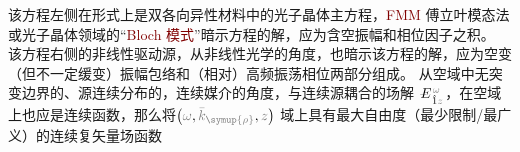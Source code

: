 {\one} 该方程左侧在形式上是双各向异性材料\cite{berryOpticalSingularitiesBianisotropic2005,changWavePropagationBianisotropic2014}中的光子晶体主方程\cite{sakodaOpticalPropertiesPhotonic2005,joannopoulosPhotonicCrystalsMolding2008}，\textcolor{Maroon}{FMM} 傅立叶模态法或光子晶体领域的“\textcolor{Maroon}{Bloch 模式}”暗示方程的解，应为含空振幅和相位因子之积。{\two} 该方程右侧的非线性驱动源，从非线性光学的角度，也暗示该方程的解，应为空变（但不一定缓变）振幅包络和（相对）高频振荡相位两部分组成\cite{boydNonlinearOptics2019}。{\three} 从空域中无突变边界的、源连续分布的，连续媒介的角度，与连续源耦合的场解 $\Xint{\mathcolor{gray}{-}}{25}{E}^{\;\!\mathcolor{gray}{\omega}}_{\;\! \hat{1} \mathcolor{gray}{z}}$，在空域上也应是连续函数，那么将$\left( \mathcolor{gray}{\omega}, \mathcolor{gray}{\bar{k}_{\symup{\rho}}}, \mathcolor{gray}{z} \right)$ 域上具有最大自由度（最少限制/最广义）的连续复矢量场函数
